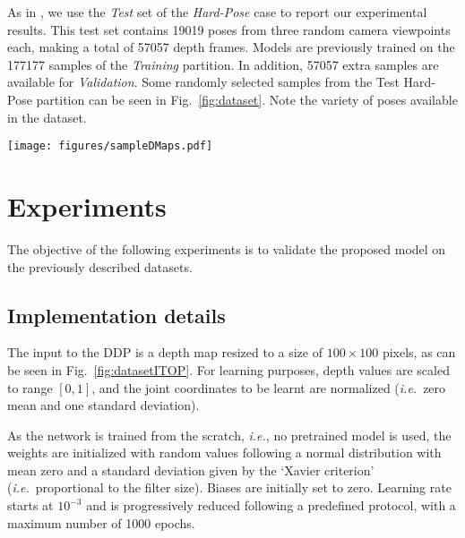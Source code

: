 \documentclass[review,12pt,3p]{elsarticle}
\def \ie{\textit{i.e.}}
\begin{document}
As in \cite{Shafaei16}, we use the \textit{Test} set of the \textit{Hard-Pose} case to report our experimental results. This test set contains 19019 poses from three random camera viewpoints each, making a total of 57057 depth  frames. Models are previously trained on the 177177 samples of the \textit{Training} partition. In addition, 57057 extra samples are available for \textit{Validation}.
Some randomly selected samples from the Test Hard-Pose partition can be seen in Fig.~\ref{fig:dataset}. Note the variety of poses available in the dataset.

\begin{figure*}[tb]
\centering
   \texttt{[image: figures/sampleDMaps.pdf]}
   \caption{\textbf{Sample depth maps from UBC3V dataset}. From left to right, the first three samples correspond to the same pose but from three different camera viewpoints. Note the variety of challenging poses. }
   \label{fig:dataset}
\end{figure*}


\section{Experiments} \label{sec:expers}
%
The objective of the following experiments is to validate the proposed model on the previously described datasets.


\subsection{Implementation details} \label{subsec:impldet}
%
The input to the DDP is a depth map resized to a size of $100 \times 100 $ pixels, as can be seen in Fig.~\ref{fig:datasetITOP}. 
For learning purposes, depth values are scaled to range $[0,1]$, and the joint coordinates to be learnt are normalized (\ie~zero mean and one standard deviation).



As the network is trained from the scratch, \ie, no pretrained model is used, the weights are initialized with random values following a normal distribution with mean zero and a standard deviation given by the `Xavier criterion' \cite{glorot2010xavier} (\ie~proportional to the filter size). Biases are initially set to zero.
% 
Learning rate starts at $10^{-3}$ and is progressively reduced following a predefined protocol, with a maximum number of 1000 epochs. 
\end{document}
